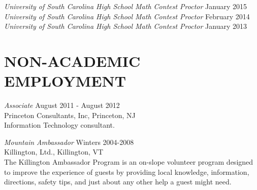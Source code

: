 \documentclass[line,overlapped]{res}
\begin{document}
\begin{resume}
                          {\sl University of South Carolina High School Math Contest Proctor} \hfill January 2015\\
                          {\sl University of South Carolina High School Math Contest Proctor} \hfill February 2014\\
                          {\sl University of South Carolina High School Math Contest Proctor} \hfill January 2013
                          
                          
                          \section{NON-ACADEMIC\\EMPLOYMENT}             
                                  {\sl Associate} \hfill August 2011 - August 2012\\
                                  Princeton Consultants, Inc, Princeton, NJ\\
                                  Information Technology consultant.

                                  {\it Mountain Ambassador} \hfill Winters 2004-2008\\
                                  Killington, Ltd., Killington, VT \\
                                  The Killington Ambassador Program is an on-slope volunteer program
                                  designed to improve the experience of guests by providing local knowledge, 
                                  information, directions, safety tips, and just about any other help a guest might need.

%
                                  

\end{resume}
\end{document}
